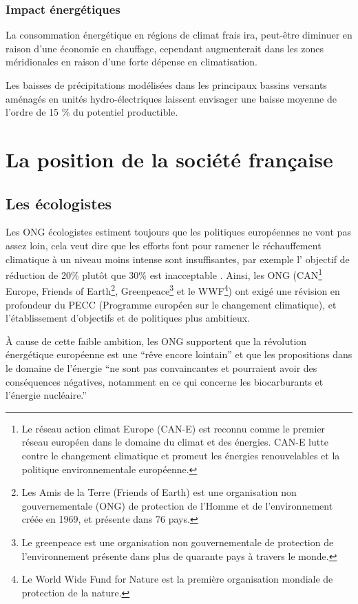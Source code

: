\documentclass[a4paper,11pt]{article}
\begin{document}
\subsubsection*{Impact énergétiques}
La consommation énergétique  en régions de climat frais  ira, peut-être diminuer
en raison  d'une économie  en chauffage, cependant  augmenterait dans  les zones
méridionales en raison d'une forte dépense en climatisation.

Les baisses de précipitations modélisées dans les principaux bassins versants
aménagés en unités hydro-électriques laissent envisager une baisse moyenne de
l’ordre de 15 \% du potentiel productible.


\section{La position de la société française}
\subsection{Les écologistes}

Les ONG écologistes estiment toujours que les politiques européennes ne vont pas
assez loin,  cela veut dire que  les efforts font pour  ramener le réchauffement
climatique à un niveau moins intense sont insuffisantes, par exemple l' objectif 
de réduction de 20\% plutôt que 30\% est inacceptable .
  Ainsi, les ONG
(CAN\footnote{Le  réseau  action climat  Europe  (CAN-E)  est  reconnu comme  le
  premier réseau européen dans le domaine du climat et des énergies. CAN-E lutte
  contre le  changement climatique et  promeut les énergies renouvelables  et la
  politique environnementale européenne.}
Europe, Friends  of Earth\footnote{Les Amis de  la Terre (Friends  of Earth) est
  une  organisation non  gouvernementale (ONG)  de protection  de l'Homme  et de
  l'environnement    créée   en    1969,   et    présente   dans    76   pays.},
Greenpeace\footnote{ Le  greenpeace est une organisation  non gouvernementale de
  protection de l'environnement présente dans plus de quarante pays à travers le
  monde.}  et le  WWF\footnote{Le World  Wide Fund  for Nature  est  la première
  organisation mondiale de protection de  la nature.}) ont exigé une révision en
profondeur  du  PECC  (Programme  européen  sur le  changement  climatique),  et
l'établissement d'objectifs et de politiques plus ambitieux.  



À cause de cette faible ambition, les ONG supportent que la révolution énergétique
européenne est une ``rêve encore lointain'' et que les propositions
dans le domaine de l'énergie ``ne  sont pas convaincantes et pourraient avoir des
conséquences  négatives,  notamment en  ce  qui  concerne  les biocarburants  et
l'énergie nucléaire.''~\cite{ONG}
\end{document}

